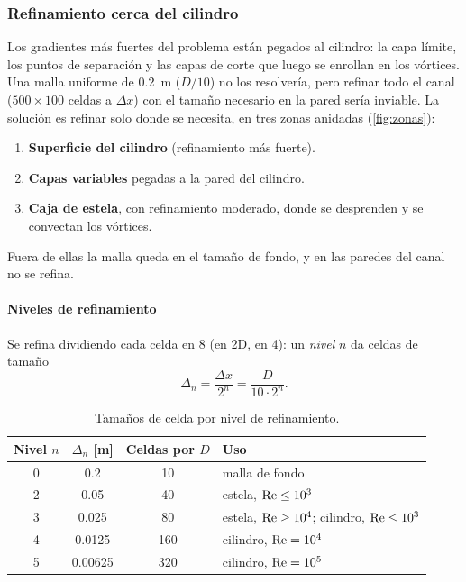 \subsubsection{Refinamiento cerca del cilindro}
\label{sec:refinamiento}
 Los gradientes más fuertes del problema están pegados al cilindro: la capa límite, los puntos de separación y las capas de corte que luego se enrollan en los vórtices. Una malla uniforme de \SI{0.2}{m} ($D/10$) no los resolvería, pero refinar todo el canal ($\num{500}\times\num{100}$ celdas a $\Delta x$) con el tamaño necesario en la pared sería inviable. La solución es refinar solo donde se necesita, en tres zonas anidadas (\cref{fig:zonas}):

\begin{enumerate}[label=\textbf{\arabic*.}]
  \item \textbf{Superficie del cilindro} (refinamiento más fuerte).
  \item \textbf{Capas variables} pegadas a la pared del cilindro.
  \item \textbf{Caja de estela}, con refinamiento moderado, donde se desprenden y se convectan los vórtices.
\end{enumerate}
Fuera de ellas la malla queda en el tamaño de fondo, y en las paredes del canal no se refina.

\paragraph{Niveles de refinamiento} Se refina dividiendo cada celda en 8 (en 2D, en 4): un \emph{nivel} $n$ da celdas de tamaño
\begin{equation}
  \Delta_n = \frac{\Delta x}{2^{n}} = \frac{D}{10\cdot 2^{n}}.
\end{equation}
\begin{table}[H]
\centering
\begin{tabular}{cccl}
\toprule
Nivel $n$ & $\Delta_n$ [\si{m}] & Celdas por $D$ & Uso \\
\midrule
0 & \num{0.2}     & 10  & malla de fondo \\
2 & \num{0.05}    & 40  & estela, $\mathrm{Re}\le10^3$ \\
3 & \num{0.025}   & 80  & estela, $\mathrm{Re}\ge10^4$; cilindro, $\mathrm{Re}\le10^3$ \\
4 & \num{0.0125}  & 160 & cilindro, $\mathrm{Re}=10^4$ \\
5 & \num{0.00625} & 320 & cilindro, $\mathrm{Re}=10^5$ \\
\bottomrule
\end{tabular}
\caption{Tamaños de celda por nivel de refinamiento.}
\end{table}



